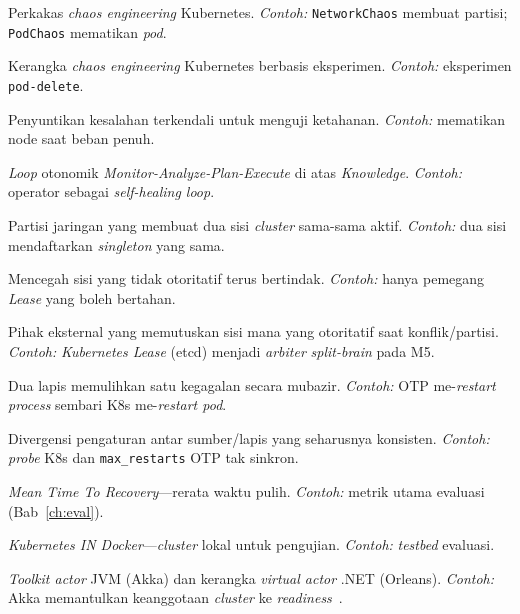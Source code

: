 \begin{description}[style=nextline,leftmargin=1.4em]
  \item[Chaos Mesh] Perkakas \emph{chaos engineering} Kubernetes. \emph{Contoh:}
    \texttt{NetworkChaos} membuat partisi; \texttt{PodChaos} mematikan \emph{pod}.
  \item[LitmusChaos] Kerangka \emph{chaos engineering} Kubernetes berbasis eksperimen.
    \emph{Contoh:} eksperimen \texttt{pod-delete}.
  \item[Fault injection] Penyuntikan kesalahan terkendali untuk menguji ketahanan.
    \emph{Contoh:} mematikan node saat beban penuh.
  \item[MAPE-K] \emph{Loop} otonomik \emph{Monitor-Analyze-Plan-Execute} di atas
    \emph{Knowledge}. \emph{Contoh:} operator sebagai \emph{self-healing loop}.
  \item[Split-brain] Partisi jaringan yang membuat dua sisi \emph{cluster} sama-sama aktif.
    \emph{Contoh:} dua sisi mendaftarkan \emph{singleton} yang sama.
  \item[Fencing] Mencegah sisi yang tidak otoritatif terus bertindak.
    \emph{Contoh:} hanya pemegang \emph{Lease} yang boleh bertahan.
  \item[Arbiter] Pihak eksternal yang memutuskan sisi mana yang otoritatif saat
    konflik/partisi. \emph{Contoh:} \emph{Kubernetes Lease} (etcd) menjadi \emph{arbiter}
    \emph{split-brain} pada M5.
  \item[Double recovery] Dua lapis memulihkan satu kegagalan secara mubazir.
    \emph{Contoh:} OTP me-\emph{restart} \emph{process} sembari K8s me-\emph{restart pod}.
  \item[Drift (konfigurasi)] Divergensi pengaturan antar sumber/lapis yang seharusnya
    konsisten. \emph{Contoh:} \emph{probe} K8s dan \texttt{max\_restarts} OTP tak sinkron.
  \item[MTTR] \emph{Mean Time To Recovery}---rerata waktu pulih. \emph{Contoh:} metrik
    utama evaluasi (Bab~\ref{ch:eval}).
  \item[kind] \emph{Kubernetes IN Docker}---\emph{cluster} lokal untuk pengujian.
    \emph{Contoh:} \emph{testbed} evaluasi.
  \item[Akka / Orleans] \emph{Toolkit actor} JVM (Akka) dan kerangka \emph{virtual actor}
    .NET (Orleans). \emph{Contoh:} Akka memantulkan keanggotaan \emph{cluster} ke
    \emph{readiness}~\cite{akkaHealth}.
\end{description}

